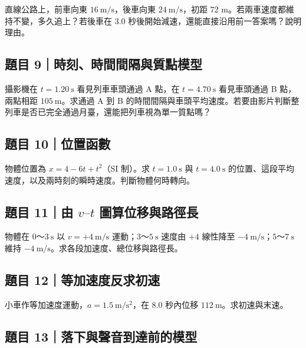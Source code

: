 \documentclass[11pt,a4paper]{article}
\begin{document}
直線公路上，前車向東 \(16\ \mathrm{m/s}\)，後車向東 \(24\ \mathrm{m/s}\)，初距 72 m。若兩車速度都維持不變，多久追上？若後車在 3.0 秒後開始減速，還能直接沿用前一答案嗎？說明理由。

\subsection{題目 9｜時刻、時間間隔與質點模型}\label{ux984cux76ee-9ux6642ux523bux6642ux9593ux9593ux9694ux8207ux8ceaux9edeux6a21ux578b}

攝影機在 \(t=1.20\ \mathrm s\) 看見列車車頭通過 A 點，在 \(t=4.70\ \mathrm s\) 看見車頭通過 B 點，兩點相距 \(105\ \mathrm m\)。求通過 A 到 B 的時間間隔與車頭平均速度。若要由影片判斷整列車是否已完全通過月臺，還能把列車視為單一質點嗎？

\subsection{題目 10｜位置函數}\label{ux984cux76ee-10ux4f4dux7f6eux51fdux6578}

物體位置為 \(x=4-6t+t^2\)（SI 制）。求 \(t=1.0\ \mathrm s\) 與 \(t=4.0\ \mathrm s\) 的位置、這段平均速度，以及兩時刻的瞬時速度。判斷物體何時轉向。

\subsection{\texorpdfstring{題目 11｜由 \(v\text{–}t\) 圖算位移與路徑長}{題目 11｜由 v\textbackslash text\{--\}t 圖算位移與路徑長}}\label{ux984cux76ee-11ux7531-vtextt-ux5716ux7b97ux4f4dux79fbux8207ux8defux5f91ux9577}

物體在 \(0\)～\(3\ \mathrm s\) 以 \(v=+4\ \mathrm{m/s}\) 運動；\(3\)～\(5\ \mathrm s\) 速度由 \(+4\) 線性降至 \(-4\ \mathrm{m/s}\)；\(5\)～\(7\ \mathrm s\) 維持 \(-4\ \mathrm{m/s}\)。求各段加速度、總位移與路徑長。

\subsection{題目 12｜等加速度反求初速}\label{ux984cux76ee-12ux7b49ux52a0ux901fux5ea6ux53cdux6c42ux521dux901f}

小車作等加速度運動，\(a=1.5\ \mathrm{m/s^2}\)，在 8.0 秒內位移 \(112\ \mathrm m\)。求初速與末速。

\subsection{題目 13｜落下與聲音到達前的模型}\label{ux984cux76ee-13ux843dux4e0bux8207ux8072ux97f3ux5230ux9054ux524dux7684ux6a21ux578b}
\end{document}
